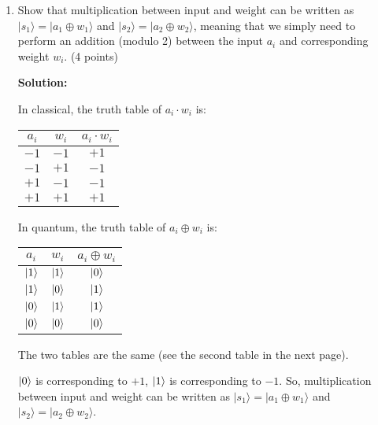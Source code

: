 \documentclass[12pt]{article}
\begin{document}
\begin{enumerate}[start=4]
    \item Show that multiplication between input and weight can be written as $|s_1\rangle = |a_1 \oplus w_1\rangle$ and $|s_2\rangle = |a_2 \oplus w_2\rangle$,
    meaning that we simply need to perform an addition (modulo 2) between the input $a_i$ and corresponding weight
    $w_i$. (4 points)

    \textbf{Solution:}

    In classical, the truth table of $a_i\cdot w_i$ is:
    \begin{table}[h]
        \centering
        \begin{tabular}{|c|c|c|}
            \hline
            $a_i$ & $w_i$ & $a_i\cdot w_i$ \\
            \hline
            $-1$  & $-1$  & $+1$            \\
            \hline
            $-1$  & $+1$  & $-1$            \\
            \hline
            $+1$  & $-1$  & $-1$            \\
            \hline
            $+1$  & $+1$  & $+1$            \\
            \hline
        \end{tabular}
    \end{table}

    In quantum, the truth table of $a_i\oplus w_i$ is:
    \begin{table}[h]
        \centering
        \begin{tabular}{|c|c|c|}
            \hline
            $a_i$       & $w_i$       & $a_i\oplus w_i$ \\
            \hline
            $\ket{1}$ & $\ket{1}$ & $\ket{0}$  \\
            \hline
            $\ket{1}$ & $\ket{0}$ & $\ket{1}$  \\
            \hline
            $\ket{0}$ & $\ket{1}$ & $\ket{1}$  \\
            \hline
            $\ket{0}$ & $\ket{0}$ & $\ket{0}$  \\
            \hline
        \end{tabular}
    \end{table}


    The two tables are the same (see the second table in the next page).

    $\ket{0}$ is corresponding to $+1$, $\ket{1}$ is corresponding to $-1$.
    So, multiplication between input and weight can be written as $|s_1\rangle = |a_1 \oplus w_1\rangle$ and $|s_2\rangle = |a_2 \oplus w_2\rangle$.
    
\end{enumerate}
\end{document}
